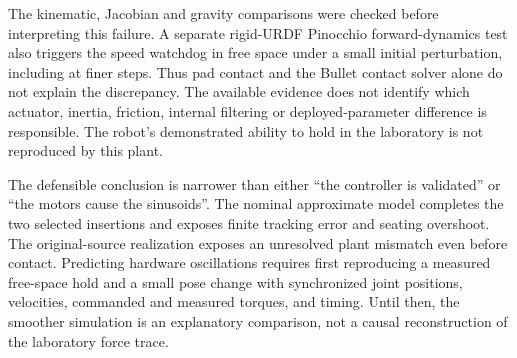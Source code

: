 The kinematic, Jacobian and gravity comparisons were checked before interpreting this failure. A separate rigid-URDF Pinocchio forward-dynamics test also triggers the speed watchdog in free space under a small initial perturbation, including at finer steps. Thus pad contact and the Bullet contact solver alone do not explain the discrepancy. The available evidence does not identify which actuator, inertia, friction, internal filtering or deployed-parameter difference is responsible. The robot's demonstrated ability to hold in the laboratory is not reproduced by this plant.

The defensible conclusion is narrower than either ``the controller is validated'' or ``the motors cause the sinusoids''. The nominal approximate model completes the two selected insertions and exposes finite tracking error and seating overshoot. The original-source realization exposes an unresolved plant mismatch even before contact. Predicting hardware oscillations requires first reproducing a measured free-space hold and a small pose change with synchronized joint positions, velocities, commanded and measured torques, and timing. Until then, the smoother simulation is an explanatory comparison, not a causal reconstruction of the laboratory force trace.

